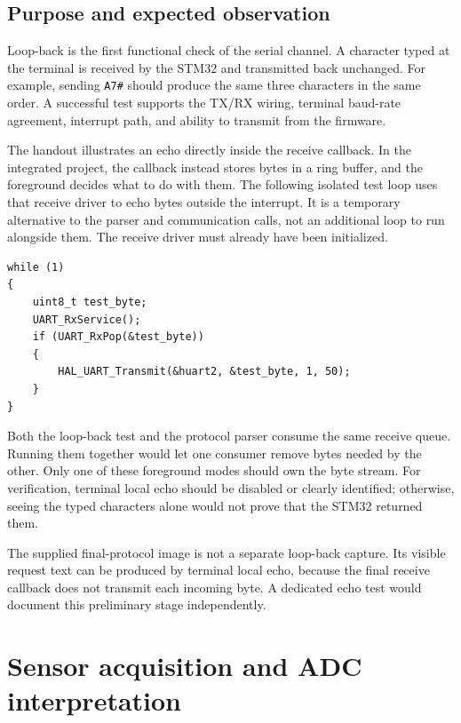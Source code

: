 \documentclass[a4paper]{article}
\newcommand{\topic}[1]{\subsection{#1}}
\begin{document}
\topic{Purpose and expected observation}

Loop-back is the first functional check of the serial channel. A character
typed at the terminal is received by the STM32 and transmitted back unchanged.
For example, sending \texttt{A7\#} should produce the same three characters in
the same order. A successful test supports the TX/RX wiring, terminal baud-rate
agreement, interrupt path, and ability to transmit from the firmware.

The handout illustrates an echo directly inside the receive callback. In the
integrated project, the callback instead stores bytes in a ring buffer, and
the foreground decides what to do with them. The following isolated test loop
uses that receive driver to echo bytes outside the interrupt. It is a temporary
alternative to the parser and communication calls, not an additional loop
to run alongside them. The receive driver must already have been initialized.


\par\noindent\begin{minipage}{\linewidth}
\begin{lstlisting}[caption={Optional foreground loop-back test},firstnumber=1]
while (1)
{
    uint8_t test_byte;
    UART_RxService();
    if (UART_RxPop(&test_byte))
    {
        HAL_UART_Transmit(&huart2, &test_byte, 1, 50);
    }
}
\end{lstlisting}
\end{minipage}\par

Both the loop-back test and the protocol parser consume the same receive
queue. Running them together would let one consumer remove bytes needed by
the other. Only one of these foreground modes should own the byte stream.
For verification, terminal local echo should be disabled or clearly identified;
otherwise, seeing the typed characters alone would not prove that the STM32
returned them.

The supplied final-protocol image is not a separate loop-back capture. Its
visible request text can be produced by terminal local echo, because the final
receive callback does not transmit each incoming byte. A dedicated echo test
would document this preliminary stage independently.


\section{Sensor acquisition and ADC interpretation}
\end{document}
